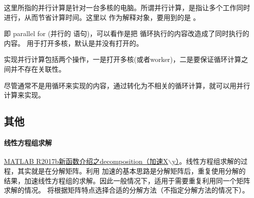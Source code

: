 这里所指的并行计算是针对一台多核的电脑。所谓并行计算，是指让多个工作同时进行，从而节省计算时间。这里以  作为解释对象，要用到的是 。\par

 即 parallel for (并行的  语句)，可以看作是把  循环执行的内容改造成了同时执行的内容。  用于打开多核，默认是并没有打开的。\par

实现并行计算包括两个操作，一是打开多核(或者worker)，二是要保证循环计算之间并不存在关联性。

\vspace{-0.8cm}


\vspace{-0.8cm}


尽管通常不是用循环来实现的内容，通过转化为不相关的循环计算，就可以用并行计算来实现。















\subsection{其他}

\paragraph{线性方程组求解} \href{https://zhuanlan.zhihu.com/p/30958676}{MATLAB R2017b新函数介绍之decomposition（加速X$\backslash$y）}。线性方程组求解的过程，其实就是在分解矩阵。利用  加速的基本思路是分解矩阵后，重复使用分解的结果，加速线性方程组的求解。因此一般情况下，适用于需要重复利用同一个矩阵求解的情况。\href{https://www.mathworks.com/help/matlab/ref/decomposition.html}{} 将根据矩阵特点选择合适的分解方法（不指定分解方法的情况下）。

\vspace{-0.8cm}


\vspace{-0.8cm}

